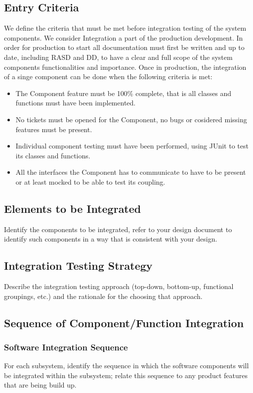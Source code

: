 \documentclass[a4paper]{article}
\begin{document}
\subsection{Entry Criteria}
We define the criteria that must be met before integration testing of the system components. We consider Integration a part of the production development. In order for production to start all documentation must first be written and up to date, including RASD and DD, to have a clear and full scope of the system components functionalities and importance. Once in production, the integration of a singe component can be done when the following criteria is met:
\begin{itemize}
\item The Component feature must be 100\% complete, that is all classes and functions must have been implemented.
\item No tickets must be opened for the Component, no bugs or cosidered missing features must be present.
\item Individual component testing must have been performed, using JUnit to test its classes and functions.
\item All the interfaces the Component has to communicate to have to be present or at least mocked to be able to test its coupling.
\end{itemize}
  
\subsection{Elements to be Integrated}
Identify the components to be integrated, refer to your design document to identify such components in a way that is consistent with your design.

\subsection{Integration Testing Strategy}
Describe the integration testing approach (top-down, bottom-up, functional groupings, etc.) and the rationale for the choosing that approach.

\subsection{Sequence of Component/Function Integration}
\subsubsection{Software Integration Sequence}
For each subsystem, identify the sequence in which the software components will be integrated within the subsystem; relate this sequence to any product features that are being build up.
\end{document}
